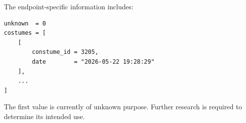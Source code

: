 The endpoint-specific information includes:

\begin{lstlisting}
unknown  = 0
costumes = [
    [
        constume_id = 3205,
        date        = "2026-05-22 19:28:29"
    ],
    ...
]
\end{lstlisting}

\begin{tcolorbox}[colback=yellow!10,colframe=orange!80!black,title=Warning]
The first value is currently of unknown purpose.
Further research is required to determine its intended use.
\end{tcolorbox}

\newpage